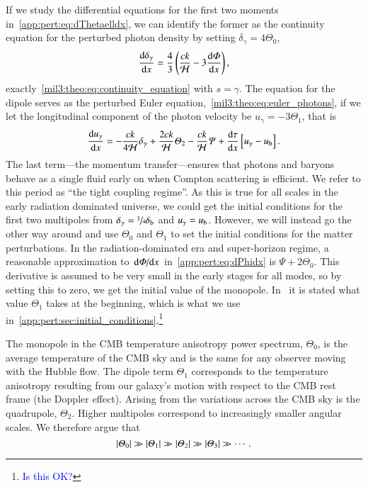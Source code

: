     If we study the differential equations for the first two moments in~\cref{app:pert:eq:dThetaelldx}, we can identify the former as the continuity equation for the perturbed photon density by setting $\delta_\gamma = 4\Theta_0$,
    \begin{equation}
        \dv{\delta_\gamma}{x}=\frac{4}{3} \left(\frac{ck}{\mathcal{H}} - 3\dv{\ensuremath{\varPhi}}{x}\right),
    \end{equation}
    exactly~\cref{mil3:theo:eq:continuity_equation} with $s=\gamma$. The equation for the dipole serves as the perturbed Euler equation,~\cref{mil3:theo:eq:euler_photons}, if we let the longitudinal component of the photon velocity be $u_\gamma=-3\Theta_1$, that is
    \begin{equation}\label{mil3:theo:eq:euler_photons}
        \dv{u_\gamma}{x} = - \frac{ck}{4\mathcal{H}} \delta_\gamma + \frac{2ck}{\mathcal{H}}\varTheta_2 - \frac{ck}{\mathcal{H}}\varPsi + \dv{\tau}{x}\left[u_\gamma -u_\mathrm{b}\right].
    \end{equation}
    The last term---the momentum transfer---ensures that photons and baryons behave as a single fluid early on when Compton scattering is efficient. We refer to this period as ``the tight coupling regime''. As this is true for all scales in the early radiation dominated universe, we could get the initial conditions for the first two multipoles from $\delta_\gamma=\sfrac{3}{4}\delta_\mathrm{b}$ and $u_\gamma=u_\mathrm{b}$. However, we will instead go the other way around and use $\Theta_0$ and $\Theta_1$ to set the initial conditions for the matter perturbations. In the radiation-dominated era and super-horizon regime, a reasonable approximation to $\dv*{\varPhi}{x}$ in~\cref{app:pert:eq:dPhidx} is $\Psi + 2\Theta_0$. This derivative is assumed to be very small in the early stages for all modes, so by setting this to zero, we get the initial value of the monopole. In~\citet[Eq.~(7.95)]{DodelsonBook} it is stated what value $\Theta_1$ takes at the beginning, which is what we use in~\cref{app:pert:sec:initial_conditions}.\footnote{\textcolor{blue}{Is this OK?}}

    The monopole in the CMB temperature anisotropy power spectrum, $\Theta_0$, is the average temperature of the CMB sky and is the same for any observer moving with the Hubble flow. The dipole term $\Theta_1$ corresponds to the temperature anisotropy resulting from our galaxy's motion with respect to the CMB rest frame (the Doppler effect). Arising from the variations across the CMB sky is the quadrupole, $\Theta_2$. Higher multipoles correspond to increasingly smaller angular scales. We therefore argue that 
    \begin{equation}
        \abs{\Theta_0} \gg \abs{\Theta_1} \gg \abs{\Theta_2} \gg \abs{\Theta_3} \gg \cdots. %
    \end{equation}
    

